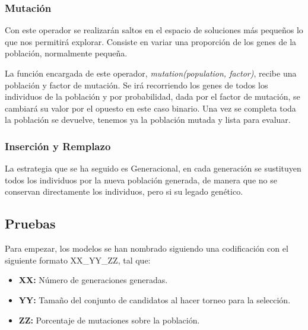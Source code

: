 \documentclass[12pt, spanish, pdftex]{UC3M_document}
\begin{document}
\subsubsection{Mutación}
Con este operador se realizarán saltos en el espacio de soluciones más pequeños lo que nos permitirá explorar. Consiste en variar una proporción de los genes de la población, normalmente pequeña.

La función encargada de este operador, \textit{mutation(population, factor)}, recibe una población y factor de mutación. Se irá recorriendo los genes de todos los individuos de la población y por probabilidad, dada por el factor de mutación, se cambiará su valor por el opuesto en este caso binario. Una vez se completa toda la población se devuelve, tenemos ya la población mutada y lista para evaluar.

\subsubsection{Inserción y Remplazo}
La estrategia que se ha seguido es Generacional, en cada generación se sustituyen todos los individuos por la nueva población generada, de manera que no se conservan directamente los individuos, pero si su legado genético.

\subsection{Pruebas}
Para empezar, los modelos  se han nombrado siguiendo una codificación con el siguiente formato XX\_YY\_ZZ, tal que:
\begin{itemize}
	\item \textbf{XX:} Número de generaciones generadas.
	\item \textbf{YY:} Tamaño del conjunto de candidatos al hacer torneo para la selección.
	\item \textbf{ZZ:} Porcentaje de mutaciones sobre la población.
\end{itemize}
\end{document}
